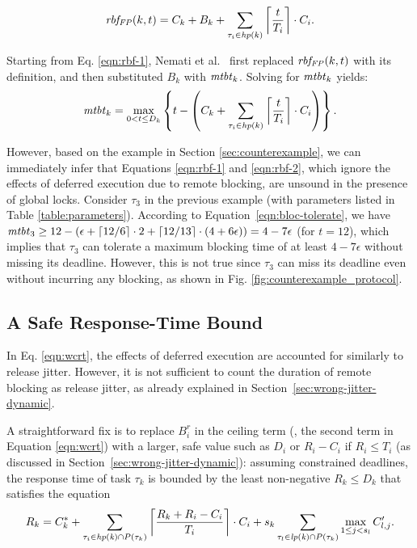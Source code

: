 \begin{equation}
\label{eqn:rbf-2}
\mathit{rbf_{FP}}(k,t) = C_k + B_k + \sum_{\tau_i \in \mathit{hp}(k)} \left \lceil \frac{t}{T_i} \right \rceil \cdot C_i.
\end{equation}

Starting from Eq. \ref{eqn:rbf-1}, Nemati et al.~\cite{NBN:11} first  replaced $\mathit{rbf_{FP}}(k,t)$ with its definition, and then substituted  $B_k$ with $\mathit{mtbt}_k$. Solving for $\mathit{mtbt}_k$ yields:
\begin{equation}
\label{eqn:bloc-tolerate}
\mathit{mtbt}_k = \max_{0<t \leq D_k} \left\{ t - \left( C_k + \sum_{\tau_i \in \mathit{hp}(k)} \left \lceil \frac{t}{T_i} \right \rceil \cdot C_i \right) \right\}.
\end{equation}

However, based on the example in Section \ref{sec:counterexample}, we can immediately infer that Equations \ref{eqn:rbf-1} and \ref{eqn:rbf-2}, which ignore the effects of deferred execution due to remote blocking, are unsound in the presence of global locks. Consider $\tau_3$ in the previous example (with parameters listed in Table \ref{table:parameters}). According to Equation~\ref{eqn:bloc-tolerate}, we have $\mathit{mtbt}_3 \geq 12 - (\epsilon + \lceil 12 / 6 \rceil \cdot 2 + \lceil 12 / 13 \rceil \cdot (4+6\epsilon)) = 4-7\epsilon$ (for $t=12$), which implies that $\tau_3$ can tolerate a maximum blocking time of at least $4-7\epsilon$ without missing its deadline. However, this is not true since $\tau_3$ can miss its deadline even without incurring any blocking, as shown in Fig. \ref{fig:counterexample_protocol}. 

\subsection{A Safe Response-Time Bound}
\label{sec:safe_bound}

In Eq. \ref{eqn:wcrt}, the effects of deferred execution  are accounted for similarly to release jitter. However, it is not sufficient to count the duration of remote blocking as release jitter, as already explained in Section~\ref{sec:wrong-jitter-dynamic}.

A straightforward fix is to replace $B_i^r$ in the ceiling term (\ie, the second term in Equation \ref{eqn:wcrt}) with a larger, safe value such as $D_i$  or $R_i - C_i$ if $R_i \leq T_i$ (as discussed in Section~\ref{sec:wrong-jitter-dynamic}): assuming constrained deadlines, the response time of task $\tau_k$ is bounded by the least non-negative $R_k \leq D_k$ that satisfies the equation
\begin{equation}
\label{eqn:wcrt-pfp-fixed}
R_k = C_k^{\ast} + \sum_{\tau_i \in \mathit{hp(k)} \cap P(\tau_k)} \left \lceil \frac{R_k + R_i - C_i}{T_i} \right \rceil \cdot C_i + s_k \sum_{\tau_l \in \mathit{lp(k)} \cap P(\tau_k)} \max_{1 \leq j < s_l} C_{l,j}^{\prime}.
\end{equation}


